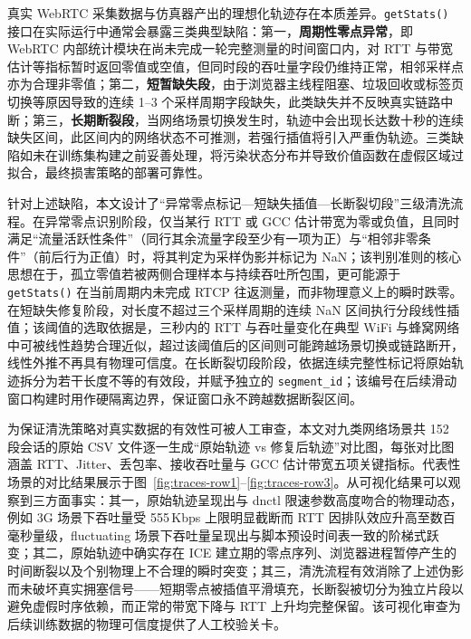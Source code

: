 真实 WebRTC 采集数据与仿真器产出的理想化轨迹存在本质差异。\texttt{getStats()} 接口在实际运行中通常会暴露三类典型缺陷：第一，\textbf{周期性零点异常}，即 WebRTC 内部统计模块在尚未完成一轮完整测量的时间窗口内，对 RTT 与带宽估计等指标暂时返回零值或空值，但同时段的吞吐量字段仍维持正常，相邻采样点亦为合理非零值；第二，\textbf{短暂缺失段}，由于浏览器主线程阻塞、垃圾回收或标签页切换等原因导致的连续 1–3 个采样周期字段缺失，此类缺失并不反映真实链路中断；第三，\textbf{长期断裂段}，当网络场景切换发生时，轨迹中会出现长达数十秒的连续缺失区间，此区间内的网络状态不可推测，若强行插值将引入严重伪轨迹。三类缺陷如未在训练集构建之前妥善处理，将污染状态分布并导致价值函数在虚假区域过拟合，最终损害策略的部署可靠性。

针对上述缺陷，本文设计了“异常零点标记—短缺失插值—长断裂切段”三级清洗流程。在异常零点识别阶段，仅当某行 RTT 或 GCC 估计带宽为零或负值，且同时满足“流量活跃性条件”（同行其余流量字段至少有一项为正）与“相邻非零条件”（前后行为正值）时，将其判定为采样伪影并标记为 NaN；该判别准则的核心思想在于，孤立零值若被两侧合理样本与持续吞吐所包围，更可能源于 \texttt{getStats()} 在当前周期内未完成 RTCP 往返测量，而非物理意义上的瞬时跌零。在短缺失修复阶段，对长度不超过三个采样周期的连续 NaN 区间执行分段线性插值；该阈值的选取依据是，三秒内的 RTT 与吞吐量变化在典型 WiFi 与蜂窝网络中可被线性趋势合理近似，超过该阈值后的区间则可能跨越场景切换或链路断开，线性外推不再具有物理可信度。在长断裂切段阶段，依据连续完整性标记将原始轨迹拆分为若干长度不等的有效段，并赋予独立的 \texttt{segment\_id}；该编号在后续滑动窗口构建时用作硬隔离边界，保证窗口永不跨越数据断裂区间。

为保证清洗策略对真实数据的有效性可被人工审查，本文对九类网络场景共 152 段会话的原始 CSV 文件逐一生成“原始轨迹 vs 修复后轨迹”对比图，每张对比图涵盖 RTT、Jitter、丢包率、接收吞吐量与 GCC 估计带宽五项关键指标。代表性场景的对比结果展示于图~\ref{fig:traces-row1}–\ref{fig:traces-row3}。从可视化结果可以观察到三方面事实：其一，原始轨迹呈现出与 dnctl 限速参数高度吻合的物理动态，例如 3G 场景下吞吐量受 555\,Kbps 上限明显截断而 RTT 因排队效应升高至数百毫秒量级，fluctuating 场景下吞吐量呈现出与脚本预设时间表一致的阶梯式跃变；其二，原始轨迹中确实存在 ICE 建立期的零点序列、浏览器进程暂停产生的时间断裂以及个别物理上不合理的瞬时突变；其三，清洗流程有效消除了上述伪影而未破坏真实拥塞信号——短期零点被插值平滑填充，长断裂被切分为独立片段以避免虚假时序依赖，而正常的带宽下降与 RTT 上升均完整保留。该可视化审查为后续训练数据的物理可信度提供了人工校验关卡。


